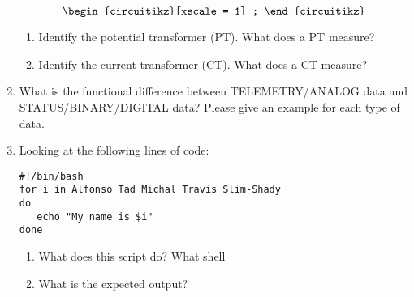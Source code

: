 \documentclass[12pt,letterpaper]{article}
\begin{document}
\begin{enumerate}[itemsep=50pt,parsep=2pt]
\begin{equation}
\begin{circuitikz}[xscale = 1]
;
\end{circuitikz}
    \end{equation}
\begin{enumerate}[itemsep=50pt,parsep=2pt]
    \item Identify the potential transformer (PT). What does a PT measure?
    \item Identify the current transformer (CT). What does a CT measure?
\end{enumerate}
\item
What is the functional difference between TELEMETRY/ANALOG data and STATUS/BINARY/DIGITAL data? Please give an example for each type of data.
\pagebreak
\item Looking at the following lines of code:
\begin{lstlisting}[style = Bash]
#!/bin/bash
for i in Alfonso Tad Michal Travis Slim-Shady
do
   echo "My name is $i"
done
    \end{lstlisting}
    \begin{enumerate} [itemsep=50pt,parsep=2pt]
        \item What does this script do? What shell 
        \item What is the expected output?
    \end{enumerate}
     

\end{enumerate}
\end{document}
